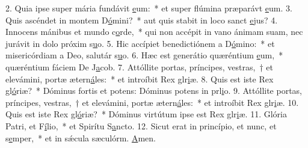 2. Quia ipse super mária fundávit \uline{e}um:~* et super flúmina præparávt \uline{e}um.
3. Quis ascéndet in montem D\uline{ó}mini?~* aut quis stabit in loco sanct \uline{e}jus?
4. Innocens mánibus et mundo c\uline{o}rde,~* qui non accépit in vano ánimam suam, nec jurávit in dolo próxim s\uline{u}o.
5. Hic accípiet benedictiónem a D\uline{ó}mino:~* et misericórdiam a Deo, salutár s\uline{u}o.
6. Hæc est generátio quæréntium \uline{e}um,~* quæréntium fáciem De J\uline{a}cob.
7. Attóllite portas, príncipes, vestras,~† et elevámini, portæ ætern\uline{á}les:~* et introíbit Rex glr\uline{i}æ.
8. Quis est iste Rex gl\uline{ó}riæ?~* Dóminus fortis et potens: Dóminus potens in prl\uline{i}o.
9. Attóllite portas, príncipes, vestras,~† et elevámini, portæ ætern\uline{á}les:~* et introíbit Rex glr\uline{i}æ.
10. Quis est iste Rex gl\uline{ó}riæ?~* Dóminus virtútum ipse est Rex glr\uline{i}æ.
11. Glória Patri, et F\uline{í}lio,~* et Spirítu S\uline{a}ncto.
12. Sicut erat in princípio, et nunc, et s\uline{e}mper,~* et in sǽcula sæculórm. \uline{A}men.
